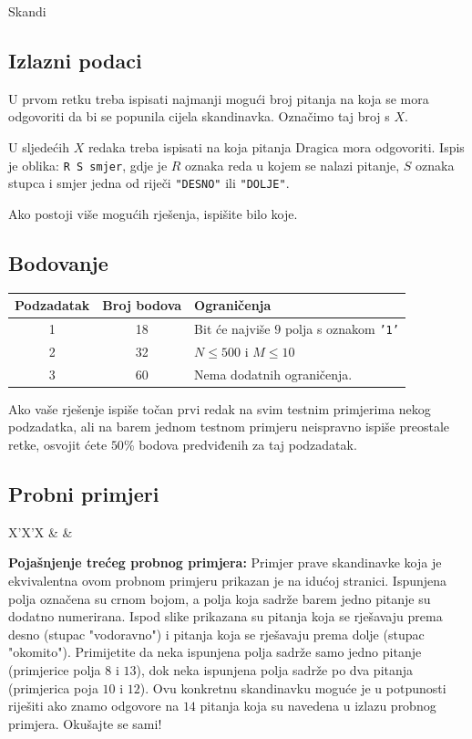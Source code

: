 \begin{statement}[
  problempoints=110,
  timelimit=10 sekundi,
  memorylimit=512 MiB,
]{Skandi}
\subsection*{Izlazni podaci}
U prvom retku treba ispisati najmanji mogući broj pitanja na koja se mora
odgovoriti da bi se popunila cijela skandinavka. Označimo taj broj s $X$.

U sljedećih $X$ redaka treba ispisati na koja pitanja Dragica mora odgovoriti.
Ispis je oblika: \texttt{R S smjer}, gdje je $R$ oznaka reda u kojem se
nalazi pitanje, $S$ oznaka stupca i smjer jedna od riječi \texttt{"DESNO"}
ili \texttt{"DOLJE"}.

Ako postoji više mogućih rješenja, ispišite bilo koje.

\subsection*{Bodovanje}
{\renewcommand{\arraystretch}{1.4}
  \setlength{\tabcolsep}{6pt}
  \begin{tabular}{ccl}
 Podzadatak & Broj bodova & Ograničenja \\ \midrule
  1 & 18 & Bit će najviše $9$ polja s oznakom \texttt{'1'} \\
  2 & 32 & $N \le 500$ i $M \le 10$\\
  3 & 60 & Nema dodatnih ograničenja. \\
\end{tabular}}

Ako vaše rješenje ispiše točan prvi redak na svim testnim primjerima nekog
podzadatka, ali na barem jednom testnom primjeru neispravno ispiše preostale
retke, osvojit ćete $50$\% bodova predviđenih za taj podzadatak.

\subsection*{Probni primjeri}
\begin{tabularx}{\textwidth}{X'X'X}
 &
 &
\end{tabularx}

\textbf{Pojašnjenje trećeg probnog primjera:}
Primjer prave skandinavke koja je ekvivalentna ovom probnom primjeru prikazan
je na idućoj stranici. Ispunjena polja označena su crnom bojom, a polja koja
sadrže barem jedno pitanje su dodatno numerirana. Ispod slike prikazana su
pitanja koja se rješavaju prema desno (stupac "vodoravno") i pitanja koja se
rješavaju prema dolje (stupac "okomito"). Primijetite da neka ispunjena polja
sadrže samo jedno pitanje (primjerice polja $8$ i $13$), dok neka ispunjena
polja sadrže po dva pitanja (primjerica poja $10$ i $12$). Ovu konkretnu
skandinavku moguće je u potpunosti riješiti ako znamo odgovore na $14$ pitanja
koja su navedena u izlazu probnog primjera. Okušajte se sami!


\end{statement}
